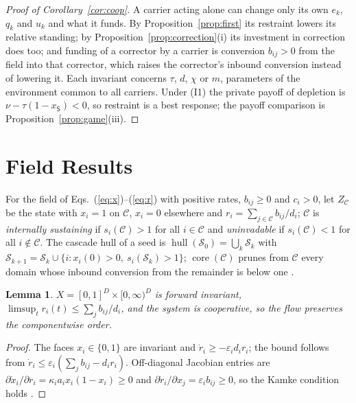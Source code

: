 \documentclass[letterpaper]{article} %
\newtheorem{lemma}{Lemma}
\theoremstyle{definition}
\newcommand{\hull}{\operatorname{hull}}
\newcommand{\core}{\operatorname{core}}
\newcommand{\dS}{\mathsf{S}}
\newcommand{\cC}{\mathcal{C}}
\newcommand{\cS}{\mathcal{S}}
\begin{document}
\begin{proof}[Proof of Corollary~\ref{cor:coop}]
A carrier acting alone can change only its own $e_k$, $q_k$ and $u_k$ and what it funds. By Proposition~\ref{prop:first} its restraint lowers its relative standing; by Proposition~\ref{prop:correction}(i) its investment in correction does too; and funding of a corrector by a carrier is conversion $b_{ij}>0$ from the field into that corrector, which raises the corrector's inbound conversion instead of lowering it. Each invariant concerns $\tau$, $d$, $\chi$ or $m$, parameters of the environment common to all carriers. Under (I1) the private payoff of depletion is $\nu-\tau(1-x_\dS)<0$, so restraint is a best response; the payoff comparison is Proposition~\ref{prop:game}(iii).
\end{proof}

\section{Field Results}\label{app:field}

For the field of Eqs.~(\ref{eq:x})--(\ref{eq:r}) with positive rates, $b_{ij}\ge0$ and $c_i>0$, let $Z_\cC$ be the state with $x_i=1$ on $\cC$, $x_i=0$ elsewhere and $r_i=\sum_{j\in\cC}b_{ij}/d_i$; $\cC$ is \emph{internally sustaining} if $s_i(\cC)>1$ for all $i\in\cC$ and \emph{uninvadable} if $s_i(\cC)<1$ for all $i\notin\cC$. The cascade hull of a seed is $\hull(\cS_0)=\bigcup_k\cS_k$ with $\cS_{k+1}=\cS_k\cup\{i:x_i(0)>0,\ s_i(\cS_k)>1\}$; $\core(\cC)$ prunes from $\cC$ every domain whose inbound conversion from the remainder is below one \citep{kempe2003,morris2000,seidman1983}.

\begin{lemma}\label{lem:basic}
$X=[0,1]^D\times[0,\infty)^D$ is forward invariant, $\limsup_tr_i(t)\le\sum_jb_{ij}/d_i$, and the system is cooperative, so the flow preserves the componentwise order.
\end{lemma}
\begin{proof}
The faces $x_i\in\{0,1\}$ are invariant and $\dot r_i\ge-\varepsilon_id_ir_i$; the bound follows from $\dot r_i\le\varepsilon_i(\sum_jb_{ij}-d_ir_i)$. Off-diagonal Jacobian entries are $\partial\dot x_i/\partial r_i=\kappa_ia_ix_i(1-x_i)\ge0$ and $\partial\dot r_i/\partial x_j=\varepsilon_ib_{ij}\ge0$, so the Kamke condition holds \citep{smith1995}.
\end{proof}
\end{document}
